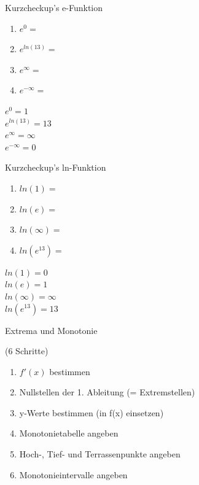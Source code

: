 \documentclass[paper=a6,landscape,ngerman,twoside=true,fontsize=12pt]{scrartcl}
\begin{document}
\begin{frage}
		Kurzcheckup's e-Funktion
		\begin{enumerate}
				\item $e^0=$\\
				\item $e^{ln(13)}=$\\
				\item $e^\infty=$\\
				\item $e^{-\infty}=$				
		\end{enumerate}
\end{frage}
\begin{antwort}
	\begin{center}
		$e^0=1$\\
		$e^{ln(13)}=13$\\
		$e^\infty=\infty$\\
		$e^{-\infty}=0$				
	\end{center}
\end{antwort}
\begin{frage}
	Kurzcheckup's ln-Funktion
	\begin{enumerate}
		\item $ln(1)=$
		\item $ln(e)=$
		\item $ln(\infty)=$
		\item $ln(e^{13})=$				
	\end{enumerate}
\end{frage}
\begin{antwort}
	\begin{center}
		$ln(1)=0$\\
		$ln(e)=1$\\
		$ln(\infty)=\infty$\\
		$ln(e^{13})=13$					
	\end{center}
\end{antwort}
\begin{frage}
	Extrema und Monotonie \bigskip 
	
	(6 Schritte)	
\end{frage}

\begin{antwort}
	\begin{enumerate}
		\item $f'(x)$ bestimmen
		\item Nullstellen der 1. Ableitung (= Extremstellen)
		\item y-Werte bestimmen (in f(x) einsetzen)
		\item Monotonietabelle angeben
		\item Hoch-, Tief- und Terrassenpunkte angeben
		\item Monotonieintervalle angeben						
	\end{enumerate}
\end{antwort}
\end{document}
